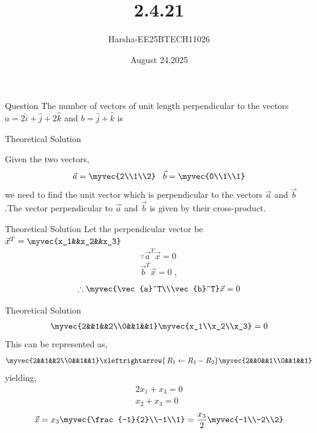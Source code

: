 \documentclass{beamer}
\title %
{2.4.21}
\date{August 24,2025}
\author %
{Harsha-EE25BTECH11026}
\begin{document}
\frame{\titlepage}
\begin{frame}{Question}
The number of vectors of unit length perpendicular to the vectors $a = 2\hat{i} + \hat{j} + 2\hat{k}$ and $b = \hat{j} + \hat{k} $ is
\end{frame}



\begin{frame}{Theoretical Solution}

Given the two vectors,
\begin{align}
    \vec{a}=\myvec{2\\1\\2} \;\;\; \vec{b}=\myvec{0\\1\\1}
\end{align}
we need to find the unit vector which is perpendicular to the vectors $\vec{a}$ and $\vec{b}$.The vector perpendicular to $\vec{a}$ and $\vec{b}$ is given by their cross-product.\\
\end{frame}

\begin{frame}{Theoretical Solution}
Let the perpendicular vector be $\vec{x}^T=\myvec{x_1&&x_2&&x_3}$
\begin{align}
    \because \vec{a}^T\vec{x}=0\\
    \vec{b}^T\vec{x}=0\;,
\end{align}
\begin{align}
    \therefore \myvec{\vec{a}^T\\\vec{b}^T}\vec{x}=0
\end{align}
\end{frame}

\begin{frame}{Theoretical Solution}
\begin{align}
    \myvec{2&&1&&2\\0&&1&&1}\myvec{x_1\\x_2\\x_3}=0
\end{align}
This can be represented as,
\begin{align}
    \myvec{2&&1&&2\\0&&1&&1}
    \xleftrightarrow{\,R_1 \gets R_1-R_2}
    \myvec{2&&0&&1\\0&&1&&1}
\end{align}
yielding,
\begin{align}
    2x_1+x_3=0\\
    x_2+x_3=0
\end{align}
\begin{align}
    \vec{x}=x_3\myvec{\frac{-1}{2}\\-1\\1}=\frac{x_3}{2}\myvec{-1\\-2\\2}
\end{align}
\end{frame}
\end{document}

